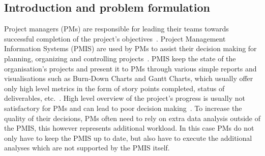\documentclass[a4paper, 12pt]{article}
\begin{document}
\subsection{Introduction and problem formulation}


Project managers (PMs) are responsible for leading their teams towards successful completion of the project's objectives~\cite{institute2017guide}. Project Management Information Systems (PMIS) are used by PMs to assist their decision making for planning, organizing and controlling projects~\cite{CANIELS2012162}. PMIS keep the state of the organisation's projects and present it to PMs through various simple reports and visualisations such as Burn-Down Charts and Gantt Charts, which usually offer only high level metrics in the form of story points completed, status of deliverables, etc.~\cite{institute2017guide}. High level overview of the project's progress is usually not satisfactory for PMs and can lead to poor decision making~\cite{CANIELS2012162}. To increase the quality of their decisions, PMs often need to rely on extra data analysis outside of the PMIS, this however represents additional workload. In this case PMs do not only have to keep the PMIS up to date, but also have to execute the additional analyses which are not supported by the PMIS itself.



\end{document}
